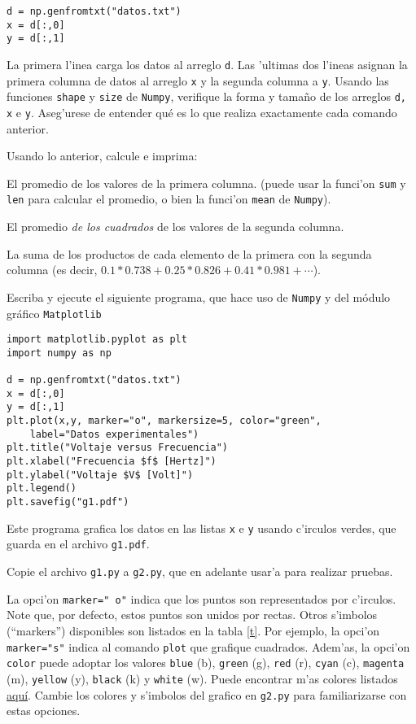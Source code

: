 \documentclass[11pt]{exam}
\begin{document}
\begin{questions}
\begin{verbatim}
d = np.genfromtxt("datos.txt")
x = d[:,0]
y = d[:,1]
\end{verbatim}

La primera l'inea carga los datos al arreglo \texttt{d}. Las 'ultimas dos l'ineas asignan la primera columna de datos al arreglo \texttt{x} y la segunda columna a \texttt{y}. Usando las funciones \texttt{shape} y \texttt{size} de \texttt{Numpy}, verifique la forma y tama\~no de los arreglos \texttt{d, x} e \texttt{y}. Aseg'urese de entender qué es lo que realiza exactamente cada comando anterior.

\item Usando lo anterior, calcule e imprima:
\begin{parts}
\item El promedio de los valores de la primera columna. (puede usar la funci'on \texttt{sum} y \texttt{len} para calcular el promedio, o bien la funci'on \texttt{mean} de \texttt{Numpy}).
\item El promedio \textit{de los cuadrados} de los valores de la segunda columna.
\item La suma de los productos de cada elemento de la primera con la segunda columna (es decir, $0.1*0.738 + 0.25 *	0.826 + 0.41 * 0.981 +\cdots$).
\end{parts}

\item Escriba y ejecute el siguiente programa, que hace uso de \texttt{Numpy} y del módulo gráfico \texttt{Matplotlib}

\begin{verbatim}
import matplotlib.pyplot as plt
import numpy as np

d = np.genfromtxt("datos.txt")
x = d[:,0]
y = d[:,1]
plt.plot(x,y, marker="o", markersize=5, color="green", 
	label="Datos experimentales")
plt.title("Voltaje versus Frecuencia")
plt.xlabel("Frecuencia $f$ [Hertz]")
plt.ylabel("Voltaje $V$ [Volt]")
plt.legend()
plt.savefig("g1.pdf")
\end{verbatim}

Este programa grafica los datos en las listas \texttt{x} e \texttt{y} usando c'irculos verdes, que guarda en el archivo \texttt{g1.pdf}.
\item Copie el archivo \texttt{g1.py} a \texttt{g2.py}, que en adelante usar'a para realizar pruebas. 
\item La opci'on \texttt{marker="\,o"} indica que los puntos son representados por c'irculos. Note que, por defecto, estos puntos son unidos por rectas. Otros s'imbolos (``markers'') disponibles son listados en la tabla \ref{t}. Por ejemplo, la opci'on \texttt{marker="s"} indica al comando \texttt{plot} que grafique cuadrados. 
Adem'as, la opci'on \texttt{color} puede adoptar los valores \texttt{blue} (b), \texttt{green} (g), \texttt{red} (r), \texttt{cyan} (c), \texttt{magenta} (m), \texttt{yellow} (y), \texttt{black} (k) y \texttt{white} (w). Puede encontrar m'as colores listados \href{http://matplotlib.org/examples/color/named_colors.html}{aqu\'i}. Cambie los colores y s'imbolos del grafico en \texttt{g2.py} para familiarizarse con estas opciones.


\end{questions}
\end{document}
